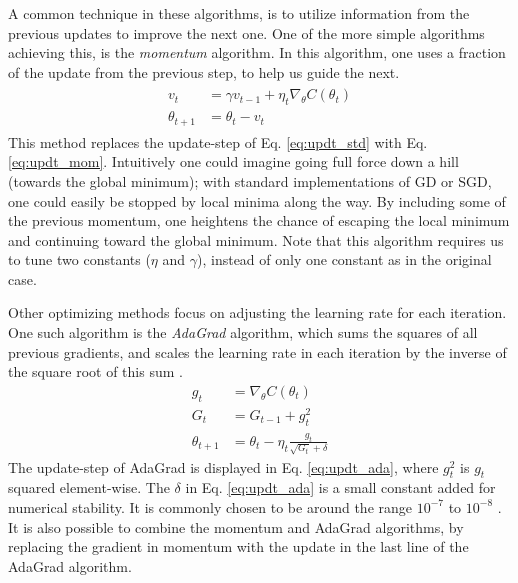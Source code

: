 A common technique in these algorithms, is to utilize information from the previous updates to improve the next one.
One of the more simple algorithms achieving this, is the \textit{momentum} algorithm.
In this algorithm, one uses a fraction of the update from the previous step, to help us guide the next.
\begin{align}\label{eq:updt_mom}
\begin{split}
    v_t &= \gamma v_{t-1} + \eta_t \nabla_{\theta}C(\theta_t) \\
    \theta_{t+1} &= \theta_t - v_t
\end{split}
\end{align}
This method replaces the update-step of Eq. \ref{eq:updt_std} with Eq. \ref{eq:updt_mom}. Intuitively one could imagine going full force down a hill (towards the global minimum); with standard implementations of GD or SGD, one could easily be stopped by local minima along the way. By including some of the previous momentum, one heightens the chance of escaping the local minimum and continuing toward the global minimum. 
Note that this algorithm requires us to tune two constants ($\eta$ and $\gamma$), instead of only one constant as in the original case.

Other optimizing methods focus on adjusting the learning rate for each iteration. One such algorithm is the \textit{AdaGrad} algorithm, which sums the squares of all previous gradients, and scales the learning rate in each iteration by the inverse of the square root of this sum \citep[p. 303]{Goodfellow-et-al-2016}.
\begin{equation}\label{eq:updt_ada}
\begin{split}
    g_t &= \nabla_{\theta}C(\theta_t)   \\
    G_t &= G_{t-1} + {g}_t^2          \\
    \theta_{t+1} &= \theta_t - \eta_t \frac{g_t}{\sqrt{G_t} + \delta}
\end{split}
\end{equation}
The update-step of AdaGrad is displayed in Eq. \ref{eq:updt_ada}, where $g_t^2$ is $g_t$ squared element-wise.
The $\delta$ in Eq. \ref{eq:updt_ada} is a small constant added for numerical stability.
It is commonly chosen to be around the range $10^{-7}$ to $10^{-8}$ \citep[p. 304]{Goodfellow-et-al-2016}.
It is also possible to combine the momentum and AdaGrad algorithms, by replacing the gradient in momentum with the update in the last line of the AdaGrad algorithm.

